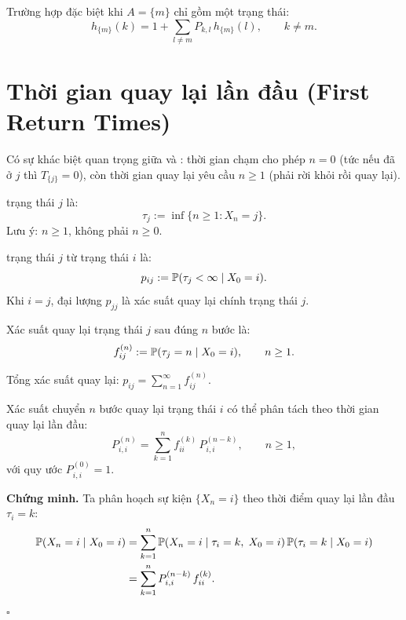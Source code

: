 Trường hợp đặc biệt khi $A = \{m\}$ chỉ gồm một trạng thái:
\[
  h_{\{m\}}(k) = 1 + \sum_{l \neq m} P_{k,l}\, h_{\{m\}}(l), \qquad k \neq m.
\]

\section{Thời gian quay lại lần đầu (First Return Times)}
\label{sec:first-return}

Có sự khác biệt quan trọng giữa  và :
thời gian chạm cho phép $n = 0$ (tức nếu đã ở $j$ thì $T_{\{j\}} = 0$),
còn thời gian quay lại yêu cầu $n \geq 1$ (phải rời khỏi rồi quay lại).

\begin{dinhnghia}
 trạng thái $j$ là:
\[
  \tau_j := \inf\{n \geq 1 : X_n = j\}.
\]
Lưu ý: $n \geq 1$, không phải $n \geq 0$.
\end{dinhnghia}

\begin{dinhnghia}
 trạng thái $j$ từ trạng thái $i$ là:
\[
  p_{ij} := \mathbb{P}(\tau_j < \infty \mid X_0 = i).
\]
Khi $i = j$, đại lượng $p_{jj}$ là xác suất quay lại chính trạng thái $j$.
\end{dinhnghia}

\begin{dinhnghia}
Xác suất quay lại trạng thái $j$ sau đúng $n$ bước là:
\[
  f_{ij}^{(n)} := \mathbb{P}(\tau_j = n \mid X_0 = i), \qquad n \geq 1.
\]
\end{dinhnghia}

Tổng xác suất quay lại: $p_{ij} = \sum_{n=1}^{\infty} f_{ij}^{(n)}$.

\begin{dinhly}
\label{thm:Pn-fn-relation}
Xác suất chuyển $n$ bước quay lại trạng thái $i$ có thể phân tách theo thời gian quay lại lần đầu:
\begin{equation}\label{eq:Pn-fn}
  P_{i,i}^{(n)} = \sum_{k=1}^{n} f_{ii}^{(k)}\, P_{i,i}^{(n-k)}, \qquad n \geq 1,
\end{equation}
với quy ước $P_{i,i}^{(0)} = 1$.
\end{dinhly}

\textbf{Chứng minh.}
Ta phân hoạch sự kiện $\{X_n = i\}$ theo thời điểm quay lại lần đầu $\tau_i = k$:
\begin{align*}
  \mathbb{P}(X_n = i \mid X_0 = i)
  &= \sum_{k=1}^{n} \mathbb{P}(X_n = i \mid \tau_i = k,\; X_0 = i)\,\mathbb{P}(\tau_i = k \mid X_0 = i)\\
  &= \sum_{k=1}^{n} P_{i,i}^{(n-k)}\, f_{ii}^{(k)}.
\end{align*}
\hfill$\square$

